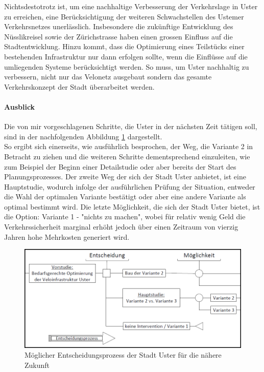 Nichtsdestotrotz ist, um eine nachhaltige Verbesserung der Verkehrslage in Uster zu erreichen, eine Berücksichtigung der weiteren Schwachstellen des Ustemer Verkehrsnetzes unerlässlich. Insbesondere die zukünftige Entwicklung des Nüsslikreisel sowie der Zürichstrasse haben einen grossen Einfluss auf die Stadtentwicklung. Hinzu kommt, dass die Optimierung eines Teilstücks einer bestehenden Infrastruktur nur dann erfolgen sollte, wenn die Einflüsse auf die umliegenden Systeme berücksichtigt werden. So muss, um Uster nachhaltig zu verbessern, nicht nur das Velonetz ausgebaut sondern das gesamte Verkehrskonzept der Stadt überarbeitet werden. 

\paragraph{Ausblick}

Die von mir vorgeschlagenen Schritte, die Uster in der nächsten Zeit tätigen soll, sind in der nachfolgenden Abbildung \ref{img:UsterFuture} dargestellt. \\
So ergibt sich einerseits, wie ausführlich besprochen, der Weg, die Variante 2 in Betracht zu ziehen und die weiteren Schritte dementsprechend einzuleiten, wie zum Beispiel der Beginn einer Detailstudie oder aber bereits der Start des Planungsprozesses. Der zweite Weg der sich der Stadt Uster anbietet, ist eine  Hauptstudie, wodurch infolge der ausführlichen Prüfung der Situation, entweder die Wahl der optimalen Variante bestätigt oder aber eine andere Variante als optimal bestimmt wird. Die letzte Möglichkeit, die sich der Stadt Uster bietet, ist die Option: Variante 1 - "nichts zu machen", wobei für relativ wenig Geld die Verkehrssicherheit marginal erhöht jedoch über einen Zeitraum von vierzig Jahren hohe Mehrkosten generiert wird.

\begin{figure}[h!]
	\centering
	\includegraphics[width=\textwidth]{figures/f-07-01-EntscheidungsprozessUster}
	\caption[Entscheidungsprozess der Stadt Uster]{Möglicher Entscheidungsprozess der Stadt Uster für die nähere Zukunft}
	\label{img:UsterFuture}
\end{figure} 






%

